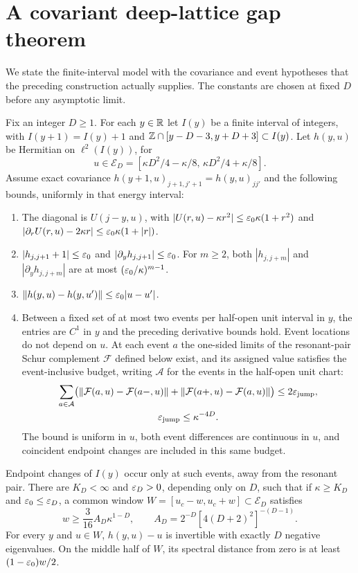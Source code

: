 \section{A covariant deep-lattice gap theorem}\label{app:below-model}
We state the finite-interval model with the covariance and event hypotheses that the preceding construction actually supplies. The constants are chosen at fixed $D$ before any asymptotic limit.

\begin{theorem}\label{thm:covariantmodel}
Fix an integer $D\ge1$. For each $y\in\mathbb R$ let $I(y)$ be a finite interval of integers, with
$I(y+1)=I(y)+1$ and
$\mathbb Z\cap[y-D-3,y+D+3]\subset I(y)$.
Let $h(y,u)$ be Hermitian on $\ell^2(I(y))$, for
\[
 u\in\mathcal E_D=[\kappa D^2/4-\kappa/8,\,
                         \kappa D^2/4+\kappa/8].
\]
Assume exact covariance $h(y+1,u)_{j+1,j'+1}=h(y,u)_{jj'}$ and the following bounds, uniformly in that energy interval:
\begin{enumerate}
\item The diagonal is $U(j-y,u)$, with
$|U(r,u)-\kappa r^2|\le\varepsilon_0\kappa(1+r^2)$ and
$|\partial_rU(r,u)-2\kappa r|\le\varepsilon_0\kappa(1+|r|)$.
\item $|h_{j,j+1}+1|\le\varepsilon_0$ and $|\partial_yh_{j,j+1}|\le\varepsilon_0$.
For $m\ge2$, both $|h_{j,j+m}|$ and $|\partial_yh_{j,j+m}|$ are at most $(\varepsilon_0/\kappa)^{m-1}$.
\item $\|h(y,u)-h(y,u')\|\le\varepsilon_0|u-u'|$.
\item Between a fixed set of at most two events per half-open unit interval in $y$, the entries are $C^1$ in $y$ and the preceding derivative bounds hold. Event locations do not depend on $u$. At each event $a$ the one-sided limits of the resonant-pair Schur complement $\mathcal F$ defined below exist, and its assigned value satisfies the event-inclusive budget, writing $\mathcal A$ for the events in the half-open unit chart:
\[
\begin{gathered}
 \sum_{a\in\mathcal A}
 \bigl(\|\mathcal F(a,u)-\mathcal F(a-,u)\|
       +\|\mathcal F(a+,u)-\mathcal F(a,u)\|\bigr)
 \le2\varepsilon_{\rm jump},\\
 \varepsilon_{\rm jump}\le\kappa^{-4D}.
\end{gathered}
\]
The bound is uniform in $u$, both event differences are continuous in $u$, and coincident endpoint changes are included in this same budget.
\end{enumerate}
Endpoint changes of $I(y)$ occur only at such events, away from the resonant pair.
There are $K_D<\infty$ and $\varepsilon_D>0$, depending only on $D$, such that if $\kappa\ge K_D$ and $\varepsilon_0\le\varepsilon_D$, a common window
$W=[u_c-w,u_c+w]\subset\mathcal E_D$ satisfies
\[
 w\ge\frac3{16}A_D\kappa^{1-D},\qquad
 A_D=2^{-D}[4(D+2)^2]^{-(D-1)}.
\]
For every $y$ and $u\in W$, $h(y,u)-u$ is invertible with exactly $D$ negative eigenvalues. On the middle half of $W$, its spectral distance from zero is at least $(1-\varepsilon_0)w/2$.
\end{theorem}
